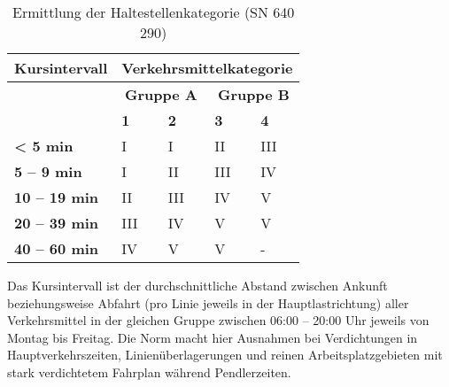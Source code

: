 \begin{table}[ht]
    \begin{tabular}[c]{l | p{2.9cm} p{2.9cm} | p{2.9cm} p{2.9cm}}
        \toprule
        \textbf{Kursintervall}
                                & \multicolumn{4}{c}{\textbf{Verkehrsmittelkategorie}}\\
        \midrule
        \textbf{}
                                & \multicolumn{2}{c|}{\textbf{Gruppe A}}
                                & \multicolumn{2}{c}{\textbf{Gruppe B}}\\
        \textbf{}
                                & \textbf{1}
                                & \textbf{2}
                                & \textbf{3}
                                & \textbf{4}\\
        \textbf{< 5 min}
                                & I
                                & I
                                & II
                                & III\\
        \textbf{5 -- 9 min}
                                & I
                                & II
                                & III
                                & IV\\
        \textbf{10 -- 19 min}
                                & II
                                & III
                                & IV
                                & V\\
        \textbf{20 -- 39 min}
                                & III
                                & IV
                                & V
                                & V\\
        \textbf{40 -- 60 min}
                                & IV
                                & V
                                & V
                                & -\\
        \bottomrule
    \end{tabular}
    \caption{Ermittlung der Haltestellenkategorie (SN 640 290)}
    \label{table:Ermittlung der Haltestellenkategorie (SN 640 290)}
\end{table}

Das Kursintervall ist der durchschnittliche Abstand zwischen Ankunft beziehungsweise Abfahrt (pro Linie jeweils in der Hauptlastrichtung) aller Verkehrsmittel in der gleichen Gruppe zwischen 06:00 -- 20:00 Uhr jeweils von Montag bis Freitag.
Die Norm macht hier Ausnahmen bei Verdichtungen in Hauptverkehrszeiten, Linienüberlagerungen und reinen Arbeitsplatzgebieten mit stark verdichtetem Fahrplan während Pendlerzeiten.

